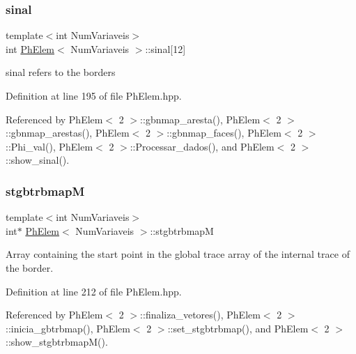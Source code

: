 \mbox{\label{classPhElem_a4034b9b2a458d1277ca74e4e8a49627e}} 
\subsubsection{\texorpdfstring{sinal}{sinal}}
{\footnotesize\ttfamily template$<$int Num\+Variaveis$>$ \\
int \hyperlink{classPhElem}{Ph\+Elem}$<$ Num\+Variaveis $>$\+::sinal\mbox{[}12\mbox{]}\hspace{0.3cm}{\ttfamily [protected]}}



sinal refers to the borders 



Definition at line 195 of file Ph\+Elem.\+hpp.



Referenced by Ph\+Elem$<$ 2 $>$\+::gbnmap\+\_\+aresta(), Ph\+Elem$<$ 2 $>$\+::gbnmap\+\_\+arestas(), Ph\+Elem$<$ 2 $>$\+::gbnmap\+\_\+faces(), Ph\+Elem$<$ 2 $>$\+::\+Phi\+\_\+val(), Ph\+Elem$<$ 2 $>$\+::\+Processar\+\_\+dados(), and Ph\+Elem$<$ 2 $>$\+::show\+\_\+sinal().

\mbox{\label{classPhElem_aebcf76eedfef93aef801fa3cab9c2708}} 
\subsubsection{\texorpdfstring{stgbtrbmapM}{stgbtrbmapM}}
{\footnotesize\ttfamily template$<$int Num\+Variaveis$>$ \\
int$\ast$ \hyperlink{classPhElem}{Ph\+Elem}$<$ Num\+Variaveis $>$\+::stgbtrbmapM\hspace{0.3cm}{\ttfamily [protected]}}



Array containing the start point in the global trace array of the internal trace of the border. 



Definition at line 212 of file Ph\+Elem.\+hpp.



Referenced by Ph\+Elem$<$ 2 $>$\+::finaliza\+\_\+vetores(), Ph\+Elem$<$ 2 $>$\+::inicia\+\_\+gbtrbmap(), Ph\+Elem$<$ 2 $>$\+::set\+\_\+stgbtrbmap(), and Ph\+Elem$<$ 2 $>$\+::show\+\_\+stgbtrbmap\+M().

